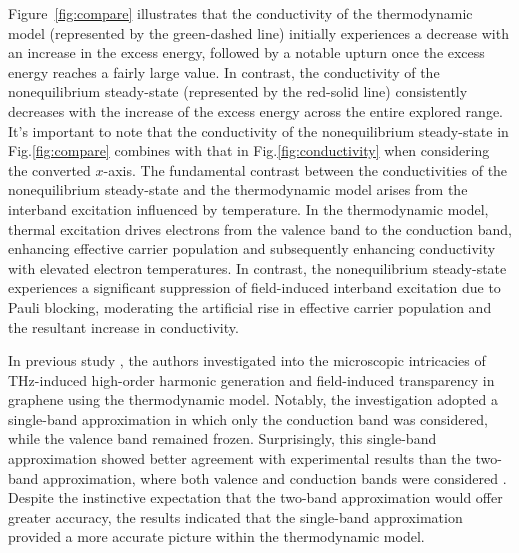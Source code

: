 Figure~\ref{fig:compare} illustrates that the conductivity of the thermodynamic model (represented by the green-dashed line) initially experiences a decrease with an increase in the excess energy, followed by a notable upturn once the excess energy reaches a fairly large value. In contrast, the conductivity of the nonequilibrium steady-state (represented by the red-solid line) consistently decreases with the increase of the excess energy across the entire explored range. It's important to note that the conductivity of the nonequilibrium steady-state in Fig.\ref{fig:compare} combines with that in Fig.\ref{fig:conductivity} when considering the converted $x$-axis. The fundamental contrast between the conductivities of the nonequilibrium steady-state and the thermodynamic model arises from the interband excitation influenced by temperature. In the thermodynamic model, thermal excitation drives electrons from the valence band to the conduction band, enhancing effective carrier population and subsequently enhancing conductivity with elevated electron temperatures. In contrast, the nonequilibrium steady-state experiences a significant suppression of field-induced interband excitation due to Pauli blocking, moderating the artificial rise in effective carrier population and the resultant increase in conductivity.

In previous study \cite{mics2015thermodynamic}, the authors investigated into the microscopic intricacies of THz-induced high-order harmonic generation and field-induced transparency in graphene using the thermodynamic model. Notably, the investigation adopted a single-band approximation in which only the conduction band was considered, while the valence band remained frozen. Surprisingly, this single-band approximation showed better agreement with experimental results than the two-band approximation, where both valence and conduction bands were considered \cite{kovalev2021electrical}. Despite the instinctive expectation that the two-band approximation would offer greater accuracy, the results indicated that the single-band approximation provided a more accurate picture within the thermodynamic model.

